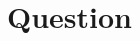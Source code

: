 \documentclass[preview, border=0.5cm]{standalone}
\begin{document}
\setcounter{section}{\learningtask}

\section*{Question \learningtask}


\end{document}
